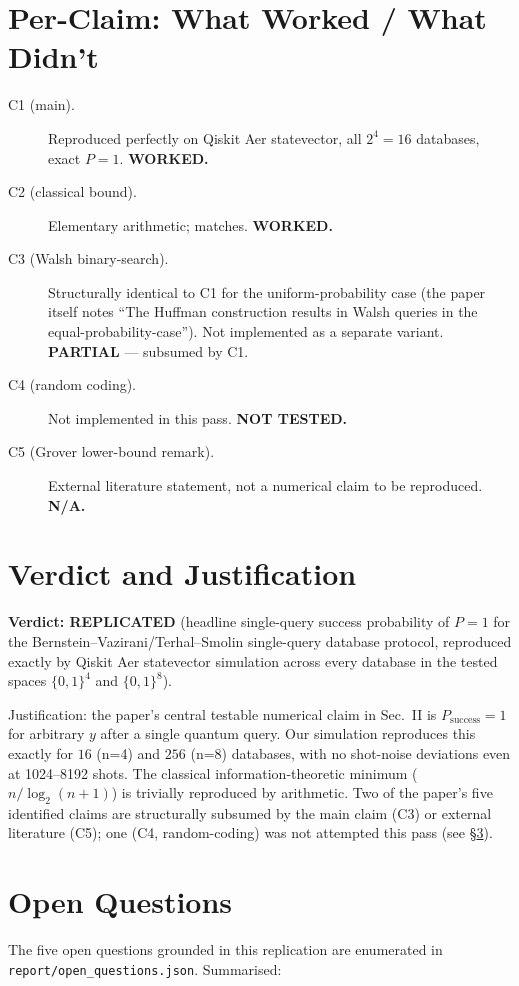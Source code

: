 \documentclass[11pt]{article}
\begin{document}
\section{Per-Claim: What Worked / What Didn't}
\begin{description}
\item[C1 (main).] Reproduced perfectly on Qiskit Aer statevector, all
    $2^4=16$ databases, exact $P=1$. \textbf{WORKED.}
\item[C2 (classical bound).] Elementary arithmetic; matches. \textbf{WORKED.}
\item[C3 (Walsh binary-search).] Structurally identical to C1 for the
    uniform-probability case (the paper itself notes ``The Huffman
    construction results in Walsh queries in the equal-probability-case'').
    Not implemented as a separate variant. \textbf{PARTIAL} --- subsumed by C1.
\item[C4 (random coding).] Not implemented in this pass. \textbf{NOT TESTED.}
\item[C5 (Grover lower-bound remark).] External literature statement, not a
    numerical claim to be reproduced. \textbf{N/A.}
\end{description}

\section{Verdict and Justification}
\textbf{Verdict: REPLICATED} (headline single-query success probability of
$P=1$ for the Bernstein--Vazirani/Terhal--Smolin single-query database
protocol, reproduced exactly by Qiskit Aer statevector simulation across
every database in the tested spaces $\{0,1\}^4$ and $\{0,1\}^8$).

Justification: the paper's central testable numerical claim in Sec.~II is
$P_\text{success}=1$ for arbitrary $y$ after a single quantum query.
Our simulation reproduces this exactly for $16$ (n=4) and $256$ (n=8) databases,
with no shot-noise deviations even at 1024--8192 shots. The classical
information-theoretic minimum ($n/\log_2(n+1)$) is trivially reproduced by
arithmetic. Two of the paper's five identified claims are structurally
subsumed by the main claim (C3) or external literature (C5); one (C4,
random-coding) was not attempted this pass (see \S\ref{sec:openq}).

\section{Open Questions}
\label{sec:openq}
The five open questions grounded in this replication are enumerated in
\verb|report/open_questions.json|. Summarised:
\end{document}
